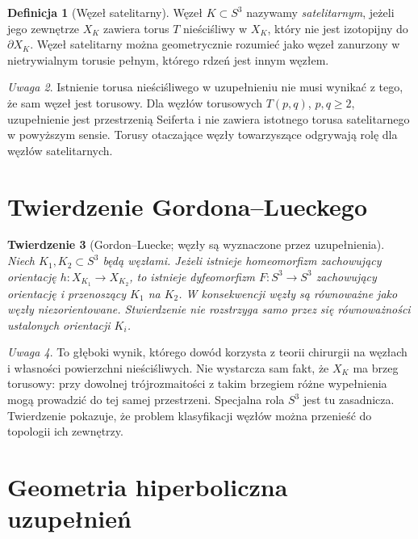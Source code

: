 \documentclass[11pt,a4paper]{report}
\numberwithin{equation}{section}
\theoremstyle{plain}
\newtheorem{twierdzenie}{Twierdzenie}[section]
\theoremstyle{definition}
\newtheorem{definicja}[twierdzenie]{Definicja}
\theoremstyle{remark}
\newtheorem{uwaga}[twierdzenie]{Uwaga}
\begin{document}
\begin{definicja}[Węzeł satelitarny]
Węzeł $K\subset S^3$ nazywamy \emph{satelitarnym}, jeżeli jego
zewnętrze $X_K$ zawiera torus $T$ nieściśliwy w $X_K$,
który nie jest izotopijny do $\partial X_K$.
Węzeł satelitarny można geometrycznie rozumieć jako
węzeł zanurzony w nietrywialnym torusie pełnym, którego rdzeń
jest innym węzłem.
\end{definicja}

\begin{uwaga}
Istnienie torusa nieściśliwego w uzupełnieniu nie musi
wynikać z tego, że sam węzeł jest torusowy. Dla węzłów
torusowych $T(p,q)$, $p,q\geq2$, uzupełnienie jest
przestrzenią Seiferta i nie zawiera istotnego torusa
satelitarnego w powyższym sensie. Torusy otaczające
węzły towarzyszące odgrywają rolę dla węzłów satelitarnych.
\end{uwaga}

\section{Twierdzenie Gordona--Lueckego}
\label{sec:kt-gl}

\begin{twierdzenie}[Gordon--Luecke; węzły są wyznaczone przez uzupełnienia]
Niech $K_1,K_2\subset S^3$ będą węzłami. Jeżeli istnieje
homeomorfizm zachowujący orientację
$h\colon X_{K_1}\to X_{K_2}$, to istnieje dyfeomorfizm
$F\colon S^3\to S^3$ zachowujący orientację i przenoszący
$K_1$ na $K_2$. W konsekwencji węzły są równoważne
jako węzły niezorientowane. Stwierdzenie nie rozstrzyga
samo przez się równoważności ustalonych orientacji $K_i$.
\end{twierdzenie}

\begin{uwaga}
To głęboki wynik, którego dowód korzysta z teorii chirurgii
na węzłach i własności powierzchni nieściśliwych.
Nie wystarcza sam fakt, że $X_K$ ma brzeg torusowy:
przy dowolnej trójrozmaitości z takim brzegiem różne
wypełnienia mogą prowadzić do tej samej przestrzeni.
Specjalna rola $S^3$ jest tu zasadnicza. Twierdzenie
pokazuje, że problem klasyfikacji węzłów można przenieść
do topologii ich zewnętrzy.
\end{uwaga}

\section{Geometria hiperboliczna uzupełnień}
\label{sec:kt-hyperbolic}
\end{document}
